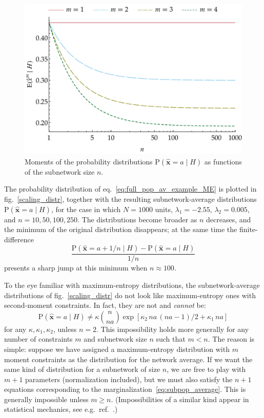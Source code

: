 \documentclass{article}
\newcommand*{\citep}{\parencites}
\theoremstyle{innote}
\newcommand*{\sav}{\widehat} %
\newcommand*{\yx}{\bm{x}}%
\newcommand*{\yxs}{\sav{\yx}}%
\newcommand*{\yH}{\varEta}
\newcommand*{\yk}{\kappa}
\newcommand*{\eg}{{e.g.}}
\newcommand*{\cond}%
{\mathpunct{|}}%
\renewcommand{\ge}{\geqslant}%
\newcommand*{\p}{\mathrm{P}}%
\renewcommand*{\|}{\cond}
\newcommand*{\+}{\lor}
\newcommand*{\eqn}{eq.}%
\newcommand*{\fig}{fig.}%
\let\varEta H
\begin{document}
\begin{figure}[!p]
\centering
\includegraphics[width=0.95\columnwidth]{scaling_subpop_moments.pdf}%
\caption{Moments of the probability distributions $\p(\yxs =a \cond
  \yH)$ as functions of the subnetwork size $n$.}
\label{scaling_moments}
\end{figure}

The probability distribution of \eqn~\eqref{eq:full_pop_av_example_ME} is
plotted in \fig~\ref{scaling_distr}, together with the resulting
subnetwork-average distributions $\p(\yxs = a \cond\yH)$, for the case in
which $N = 1000$ units, $\lambda_1=-2.55$, $\lambda_2=0.005$, and
$n=10, 50, 100, 250$. The distributions become broader as $n$ decreases,
and the minimum of the original distribution disappears; at the same time
the finite-difference
\[\frac{\p(\yxs=a+1/n\cond\yH)-\p(\yxs=a\cond\yH)}{1/n}\]
presents a sharp jump at this minimum when $n\approx 100$.

To the eye familiar with maximum-entropy distributions, the
subnetwork-average distributions of \fig~\ref{scaling_distr} do not look
like maximum-entropy ones with second-moment constraints. In fact,
they are not and \emph{cannot} be:
\begin{equation}
  \label{eq:maxent_form_sub}
  \p(\yxs =a  \cond \yH)
\ne\kappa\binom{n}{n a}\exp[\yk_2\, n a\,(n a-1)/2 + \yk_1\, n a]
\end{equation}
for any $\kappa, \yk_1, \yk_2$, unless $n=2$. This impossibility holds more
generally for any number of constraints $m$ and subnetwork size $n$ such
that $m<n$. The reason is simple: suppose we have assigned a
maximum-entropy distribution with $m$ moment constraints as the
distribution for the network average. If we want the same kind of
distribution for a subnetwork of size $n$, we are free to play with $m+1$
parameters (normalization included), but we must also satisfy the $n+1$
equations corresponding to the marginalization~\eqref{eq:subpop_average}.
This is generally impossible unless $m \ge n$. (Impossibilities of a
similar kind appear in statistical mechanics, see \eg\
ref.~\citep{maesetal1999}.)
\end{document}
